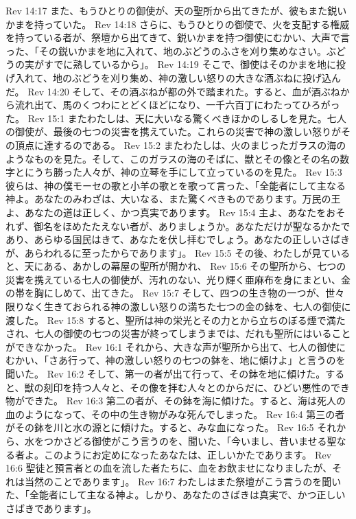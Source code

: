Rev 14:17  また、もうひとりの御使が、天の聖所から出てきたが、彼もまた鋭いかまを持っていた。
Rev 14:18  さらに、もうひとりの御使で、火を支配する権威を持っている者が、祭壇から出てきて、鋭いかまを持つ御使にむかい、大声で言った、「その鋭いかまを地に入れて、地のぶどうのふさを刈り集めなさい。ぶどうの実がすでに熟しているから」。
Rev 14:19  そこで、御使はそのかまを地に投げ入れて、地のぶどうを刈り集め、神の激しい怒りの大きな酒ぶねに投げ込んだ。
Rev 14:20  そして、その酒ぶねが都の外で踏まれた。すると、血が酒ぶねから流れ出て、馬のくつわにとどくほどになり、一千六百丁にわたってひろがった。
Rev 15:1  またわたしは、天に大いなる驚くべきほかのしるしを見た。七人の御使が、最後の七つの災害を携えていた。これらの災害で神の激しい怒りがその頂点に達するのである。
Rev 15:2  またわたしは、火のまじったガラスの海のようなものを見た。そして、このガラスの海のそばに、獣とその像とその名の数字とにうち勝った人々が、神の立琴を手にして立っているのを見た。
Rev 15:3  彼らは、神の僕モーセの歌と小羊の歌とを歌って言った、「全能者にして主なる神よ。あなたのみわざは、大いなる、また驚くべきものであります。万民の王よ、あなたの道は正しく、かつ真実であります。
Rev 15:4  主よ、あなたをおそれず、御名をほめたたえない者が、ありましょうか。あなただけが聖なるかたであり、あらゆる国民はきて、あなたを伏し拝むでしょう。あなたの正しいさばきが、あらわれるに至ったからであります」。
Rev 15:5  その後、わたしが見ていると、天にある、あかしの幕屋の聖所が開かれ、
Rev 15:6  その聖所から、七つの災害を携えている七人の御使が、汚れのない、光り輝く亜麻布を身にまとい、金の帯を胸にしめて、出てきた。
Rev 15:7  そして、四つの生き物の一つが、世々限りなく生きておられる神の激しい怒りの満ちた七つの金の鉢を、七人の御使に渡した。
Rev 15:8  すると、聖所は神の栄光とその力とから立ちのぼる煙で満たされ、七人の御使の七つの災害が終ってしまうまでは、だれも聖所にはいることができなかった。
Rev 16:1  それから、大きな声が聖所から出て、七人の御使にむかい、「さあ行って、神の激しい怒りの七つの鉢を、地に傾けよ」と言うのを聞いた。
Rev 16:2  そして、第一の者が出て行って、その鉢を地に傾けた。すると、獣の刻印を持つ人々と、その像を拝む人々とのからだに、ひどい悪性のでき物ができた。
Rev 16:3  第二の者が、その鉢を海に傾けた。すると、海は死人の血のようになって、その中の生き物がみな死んでしまった。
Rev 16:4  第三の者がその鉢を川と水の源とに傾けた。すると、みな血になった。
Rev 16:5  それから、水をつかさどる御使がこう言うのを、聞いた、「今いまし、昔いませる聖なる者よ。このようにお定めになったあなたは、正しいかたであります。
Rev 16:6  聖徒と預言者との血を流した者たちに、血をお飲ませになりましたが、それは当然のことであります」。
Rev 16:7  わたしはまた祭壇がこう言うのを聞いた、「全能者にして主なる神よ。しかり、あなたのさばきは真実で、かつ正しいさばきであります」。
